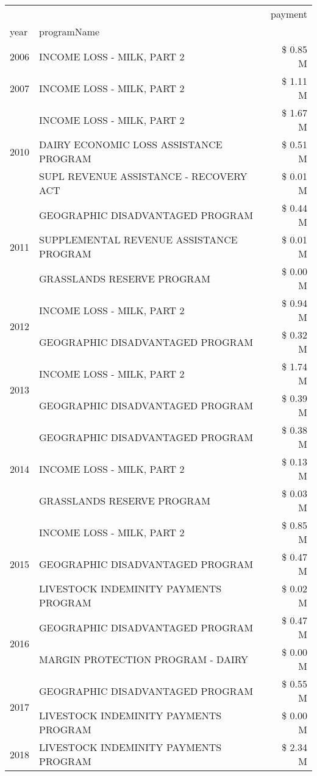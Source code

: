 \begin{tabular}{llr}
\toprule
 &  & payment \\
year & programName &  \\
\midrule
2006 & INCOME LOSS - MILK, PART 2 & \$ 0.85 M \\
\cline{1-3}
2007 & INCOME LOSS - MILK, PART 2 & \$ 1.11 M \\
\cline{1-3}
\multirow[t]{3}{*}{2010} & INCOME LOSS - MILK, PART 2 & \$ 1.67 M \\
 & DAIRY ECONOMIC LOSS ASSISTANCE PROGRAM & \$ 0.51 M \\
 & SUPL REVENUE ASSISTANCE - RECOVERY ACT & \$ 0.01 M \\
\cline{1-3}
\multirow[t]{3}{*}{2011} & GEOGRAPHIC DISADVANTAGED PROGRAM & \$ 0.44 M \\
 & SUPPLEMENTAL REVENUE ASSISTANCE PROGRAM & \$ 0.01 M \\
 & GRASSLANDS RESERVE PROGRAM & \$ 0.00 M \\
\cline{1-3}
\multirow[t]{2}{*}{2012} & INCOME LOSS - MILK, PART 2 & \$ 0.94 M \\
 & GEOGRAPHIC DISADVANTAGED PROGRAM & \$ 0.32 M \\
\cline{1-3}
\multirow[t]{2}{*}{2013} & INCOME LOSS - MILK, PART 2 & \$ 1.74 M \\
 & GEOGRAPHIC DISADVANTAGED PROGRAM & \$ 0.39 M \\
\cline{1-3}
\multirow[t]{3}{*}{2014} & GEOGRAPHIC DISADVANTAGED PROGRAM & \$ 0.38 M \\
 & INCOME LOSS - MILK, PART 2 & \$ 0.13 M \\
 & GRASSLANDS RESERVE PROGRAM & \$ 0.03 M \\
\cline{1-3}
\multirow[t]{3}{*}{2015} & INCOME LOSS - MILK, PART 2 & \$ 0.85 M \\
 & GEOGRAPHIC DISADVANTAGED PROGRAM & \$ 0.47 M \\
 & LIVESTOCK INDEMINITY PAYMENTS PROGRAM & \$ 0.02 M \\
\cline{1-3}
\multirow[t]{2}{*}{2016} & GEOGRAPHIC DISADVANTAGED PROGRAM & \$ 0.47 M \\
 & MARGIN PROTECTION PROGRAM - DAIRY & \$ 0.00 M \\
\cline{1-3}
\multirow[t]{2}{*}{2017} & GEOGRAPHIC DISADVANTAGED PROGRAM & \$ 0.55 M \\
 & LIVESTOCK INDEMINITY PAYMENTS PROGRAM & \$ 0.00 M \\
\cline{1-3}
\multirow[t]{3}{*}{2018} & LIVESTOCK INDEMINITY PAYMENTS PROGRAM & \$ 2.34 M \\

\end{tabular}
